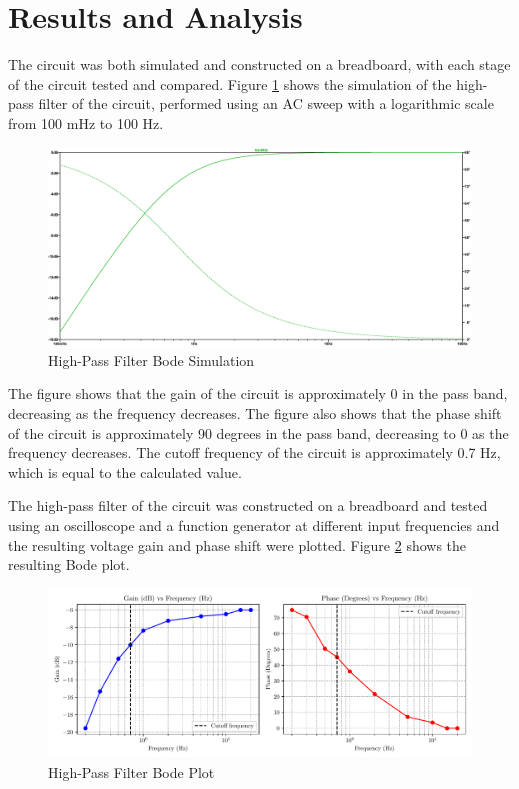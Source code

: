 \documentclass[CMPE]{KGCOEReport}
\begin{document}
\section*{Results and Analysis}

The circuit was both simulated and constructed on a breadboard, with each stage of the circuit tested and compared. Figure \ref{fig:highPassSim} shows the simulation of the high-pass filter of the circuit, performed using an AC sweep with a logarithmic scale from 100 mHz to 100 Hz.

\begin{figure}[H]
    \centering
    \includegraphics[width=1\textwidth]{SimFreqHighPass.png}
    \caption{High-Pass Filter Bode Simulation}
    \label{fig:highPassSim}
\end{figure}

The figure shows that the gain of the circuit is approximately 0 in the pass band, decreasing as the frequency decreases. The figure also shows that the phase shift of the circuit is approximately 90 degrees in the pass band, decreasing to 0 as the frequency decreases. The cutoff frequency of the circuit is approximately 0.7 Hz, which is equal to the calculated value.

The high-pass filter of the circuit was constructed on a breadboard and tested using an oscilloscope and a function generator at different input frequencies and the resulting voltage gain and phase shift were plotted. Figure \ref{fig:highPassBode} shows the resulting Bode plot.

\begin{figure}[H]
    \centering
    \includegraphics[width=1\textwidth]{high_pass_plot.pdf}
    \caption{High-Pass Filter Bode Plot}
    \label{fig:highPassBode}
\end{figure}
\end{document}
